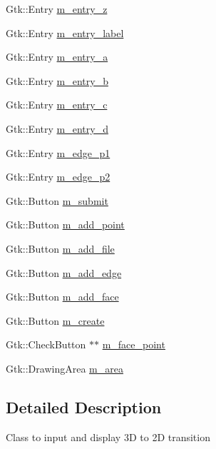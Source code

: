 \begin{DoxyCompactItemize}
\item 
Gtk\+::\+Entry \hyperlink{class_projection_window_a7e164e49ce6775ff25abf0ffb62fbd44}{m\+\_\+entry\+\_\+z}
\item 
Gtk\+::\+Entry \hyperlink{class_projection_window_a490b52bafb75b5e5530bf1802b02e16a}{m\+\_\+entry\+\_\+label}
\item 
Gtk\+::\+Entry \hyperlink{class_projection_window_a54f16f711d126320ac548e3bbc7a042d}{m\+\_\+entry\+\_\+a}
\item 
Gtk\+::\+Entry \hyperlink{class_projection_window_aa5f43966a100ea7df6ee79cc980d90be}{m\+\_\+entry\+\_\+b}
\item 
Gtk\+::\+Entry \hyperlink{class_projection_window_a3b4562aa11344b7676182bf35502881f}{m\+\_\+entry\+\_\+c}
\item 
Gtk\+::\+Entry \hyperlink{class_projection_window_a5ae59154fe9dd24c67e3db07c0d75521}{m\+\_\+entry\+\_\+d}
\item 
Gtk\+::\+Entry \hyperlink{class_projection_window_ae18dd1142ec2291156359d603627f260}{m\+\_\+edge\+\_\+p1}
\item 
Gtk\+::\+Entry \hyperlink{class_projection_window_a2cc6daee71ec01c27f32e02c49ade20e}{m\+\_\+edge\+\_\+p2}
\item 
Gtk\+::\+Button \hyperlink{class_projection_window_a1081eb0b152ae185a1f20b433c58b276}{m\+\_\+submit}
\item 
Gtk\+::\+Button \hyperlink{class_projection_window_a03c1bd15354e834e53e9c9fed3ed8d5c}{m\+\_\+add\+\_\+point}
\item 
Gtk\+::\+Button \hyperlink{class_projection_window_ae9fa524662253dcf60873ccbfb525e53}{m\+\_\+add\+\_\+file}
\item 
Gtk\+::\+Button \hyperlink{class_projection_window_a0baecbe177aeb406dee043a3fba5c6f2}{m\+\_\+add\+\_\+edge}
\item 
Gtk\+::\+Button \hyperlink{class_projection_window_a87da0ada2d0513183f6f6a2c3a71ad89}{m\+\_\+add\+\_\+face}
\item 
Gtk\+::\+Button \hyperlink{class_projection_window_ad2730bbdb94961b441cb6a40c937326e}{m\+\_\+create}
\item 
Gtk\+::\+Check\+Button $\ast$$\ast$ \hyperlink{class_projection_window_ae4ba55b88388ba52011c1c5d3ca215a7}{m\+\_\+face\+\_\+point}
\item 
Gtk\+::\+Drawing\+Area \hyperlink{class_projection_window_a339dcd397e1421ed780004f90a59ce34}{m\+\_\+area}
\end{DoxyCompactItemize}


\subsection{Detailed Description}
Class to input and display 3D to 2D transition 

